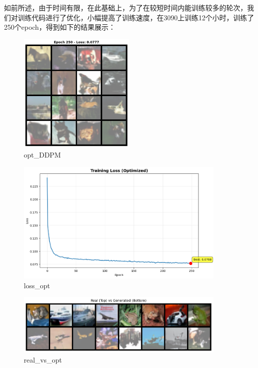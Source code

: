 \documentclass{ctexart}
\begin{document}
\noindent
如前所述，由于时间有限，在此基础上，为了在较短时间内能训练较多的轮次，我们对训练代码进行了优化，小幅提高了训练速度，在3090上训练12个小时，训练了250个epoch，得到如下的结果展示：
\begin{figure}[H]
     \centering
     \includegraphics[width=0.5\textwidth]{epoch_250_samples_opt.png}
     \caption{opt\_DDPM}
     \label{fig:opt_ddpm}  %
\end{figure}

\begin{figure}[H]
     \centering
     \includegraphics[width=0.9\textwidth]{loss_curve_epoch_250_opt.png}
     \caption{loss\_opt}
     \label{fig:loss_opt}  %
\end{figure}

\begin{figure}[H]
     \centering
     \includegraphics[width=0.9\textwidth]{real_vs_opt.png}
     \caption{real\_vs\_opt}
     \label{fig:real_vs_opt}  %
\end{figure}
\end{document}
